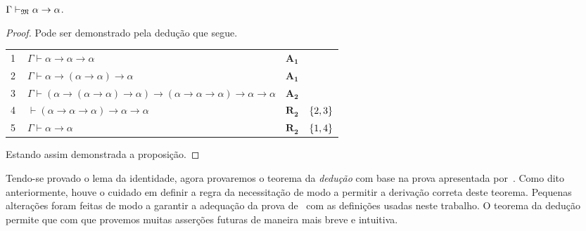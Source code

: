     \begin{tcolorbox}[enhanced jigsaw, breakable, sharp corners, colframe=black, colback=white, boxrule=0.5pt, left=1.5mm, right=1.5mm, top=1.5mm, bottom=1.5mm]
    \begin{lemma}[Identidade]\label{identity}
        $\Gamma\mathrel{\vdash}_\mathfrak{M}\alpha\to\alpha$.
        \begin{proof}
            Pode ser demonstrado pela dedução que segue.

            \vspace{0.5\baselineskip}
            \footnotesize
            \newlength{\rowskip}
            \setlength{\rowskip}{0.5\baselineskip}
            \begin{xltabular}{\textwidth}{r | X l l}
                \scriptsize{\phantom{0}1}\phantom{ } & $\ \Gamma\vdash\alpha\to\alpha\to\alpha$                                                              & \hyperref[modal.axiom.1]{$\mathbf{A_1}$}           & \\[\rowskip]
                \scriptsize{\phantom{0}2}\phantom{ } & $\ \Gamma\vdash\alpha\to(\alpha\to\alpha)\to\alpha$                                                   & \hyperref[modal.axiom.1]{$\mathbf{A_1}$}           & \\[\rowskip]
                \scriptsize{\phantom{0}3}\phantom{ } & $\ \Gamma\vdash(\alpha\to(\alpha\to\alpha)\to\alpha)\to(\alpha\to\alpha\to\alpha)\to\alpha\to\alpha$  & \hyperref[modal.axiom.1]{$\mathbf{A_2}$}           & \\[\rowskip]
                \scriptsize{\phantom{0}4}\phantom{ } & $\ \vdash(\alpha\to\alpha\to\alpha)\to\alpha\to\alpha$                                                & $\hyperref[modal.rule.2]{\mathbf{R_2}}$            & $\left\{2,3\right\}$\\[\rowskip]
                \scriptsize{\phantom{0}5}\phantom{ } & $\ \Gamma\vdash\alpha\to\alpha$                                                                       & $\hyperref[modal.rule.2]{\mathbf{R_2}}$\phantom{1} & $\left\{1,4\right\}$
            \end{xltabular}
            \normalsize

            \vspace{.5\baselineskip}
            Estando assim demonstrada a proposição.
        \end{proof}
    \end{lemma}
    \end{tcolorbox}

    \vspace{.5\baselineskip}
    Tendo-se provado o lema da identidade, agora provaremos o teorema da \emph{dedução} com base na prova apresentada por~\cite{Hakli+Negri.2012}.
    Como dito anteriormente, houve o cuidado em definir a regra da necessitação de modo a permitir a derivação correta deste teorema.
    Pequenas alterações foram feitas de modo a garantir a adequação da prova de~\cite{Hakli+Negri.2012} com as definições usadas neste trabalho.
    O teorema da dedução permite que com que provemos muitas asserções futuras de maneira mais breve e intuitiva.

